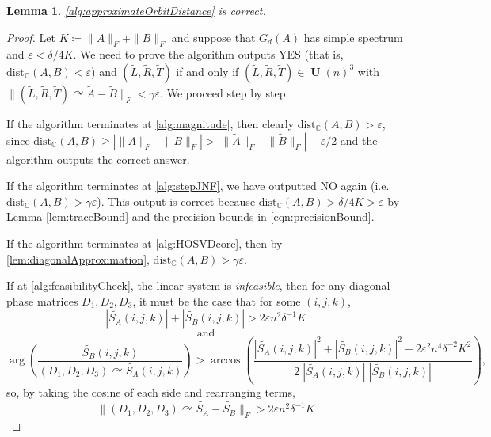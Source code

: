 \documentclass[11pt]{article}
\numberwithin{equation}{section}
\newtheorem{lemma}[theorem]{Lemma}
\theoremstyle{remark}
\DeclareMathOperator{\Unitary}{\textbf{U}}
\newcommand{\C}{\mathbb{C}}
\newcommand{\dist}{\mathrm{dist}}
\newcommand{\CC}{\mathbb{C}}
\begin{document}
\begin{lemma}\label{lem:approxOrbitCorrect}
\cref{alg:approximateOrbitDistance} is correct. 
\end{lemma}
\begin{proof}
Let $K\coloneqq\|A\|_F+\|B\|_F$
and suppose that $G_d(A)$ has simple spectrum and $\varepsilon<\delta/4K$. We need to prove the algorithm outputs \textsf{YES} (that is, $\dist_\C(A,B)<\varepsilon$) and 
$(\widetilde{L},\widetilde{R},\widetilde{T})$ if and only if $(\widetilde{L},\widetilde{R},\widetilde{T}) \in \Unitary(n)^3$ with $\| (\widetilde{L},\widetilde{R}, \widetilde{T}) \curvearrowright \widetilde{A}-\widetilde{B}\|_F<\gamma\varepsilon$.
We proceed step by step. 

If the algorithm terminates at \ref{alg:magnitude}, then clearly $\dist_{\CC}(A,B)>\varepsilon$, since $\dist_\C(A,B)\geq\left|\|A\|_F-\|B\|_F\right|>\left|\|\widetilde{A}\|_F-\|\widetilde{B}\|_F\right|-\varepsilon/2$ and the algorithm outputs the correct answer.

If the algorithm terminates at \ref{alg:stepJNF}, we have outputted \textsf{NO} again (i.e.\
$\dist_{\CC}(A,B)>\gamma\varepsilon$). This output is correct because $\dist_{\CC}(A,B)>\delta/4K>\varepsilon$ by Lemma \ref{lem:traceBound} and the precision bounds in \cref{eqn:precisionBound}.

If the algorithm terminates at \ref{alg:HOSVDcore}, then by \cref{lem:diagonalApproximation}, $\dist_\C(A,B) > \gamma\varepsilon$.

If at \ref{alg:feasibilityCheck}, the linear system is \emph{infeasible},
then for any diagonal phase matrices $D_1,D_2,D_3$, 
it must be the case that for some $(i,j,k)$, 
\[|\widetilde{S_A}(i,j,k)|+|\widetilde{S_B}(i,j,k)|> 2\varepsilon n^2\delta^{-1}K\]\[\text{ and }\] 
\[\arg\left(\frac{\widetilde{S_B}(i,j,k)}{(D_1,D_2,D_3)\curvearrowright\widetilde{S_A}(i,j,k)} \right)>
\arccos\left(\frac{|\widetilde{S_A}(i,j,k)|^2+|\widetilde{S_B}(i,j,k)|^2-2\varepsilon^2 n^4\delta^{-2}K^2}{2\;|\widetilde{S_A}(i,j,k)|\;|\widetilde{S_B}(i,j,k)|}\right),\] 
so, by taking the cosine of each side and rearranging terms,
\[
\|(D_1,D_2,D_3)\curvearrowright\widetilde{S_A}-\widetilde{S_B}\|_F > 2\varepsilon n^2\delta^{-1}K
\]


\end{proof}
\end{document}

